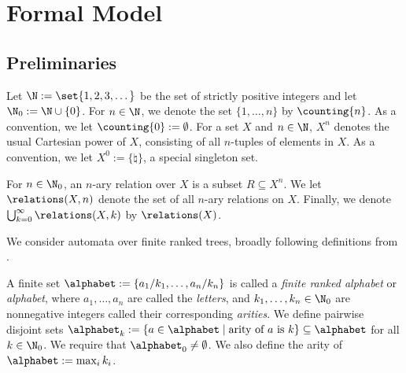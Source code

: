 \section{Formal Model}\label{sec:formalModel-trees}

\subsection{Preliminaries}\label{subsec:preliminaries}

Let $\N := \set{1, 2, 3, \dots}$ be the set of strictly positive integers and let $\N_0 := \N \cup \{0\}$. For $n \in \N$, we denote the set $\{1, \ldots, n\}$ by $\counting{n}$. As a convention, we let $\counting{0} := \emptyset$. For a set $X$ and $n \in \N$, $X^n$ denotes the usual Cartesian power of $X$, consisting of all $n$-tuples of elements in $X$. As a convention, we let $X^0 := \{\natural\}$, a special singleton set.


For $n \in \N_0$, an $n$-ary relation over $X$ is a subset $R \subseteq X^n$. We let $\relations(X, n)$ denote the set of all $n$-ary relations on $X$. Finally, we denote $\bigcup_{k=0}^\infty \relations(X, k)$ by $\relations(X)$.


We consider automata over finite ranked trees, broadly following definitions from \cite{tata}.

\begin{definition}[Alphabet]\label{def:alphabet}
    A finite set $\alphabet := \{a_1/k_1, \dots, a_n/k_n\}$ is called a \emph{finite ranked alphabet} or \emph{alphabet}, where $a_1, \dots, a_n$ are called the \emph{letters}, and $k_1, \dots, k_n \in \N_0$ are nonnegative integers called their corresponding \emph{arities}. We define pairwise disjoint sets $\alphabet_k := \{a \in \alphabet \mid \mbox{arity of $a$ is $k$}\} \subseteq \alphabet$ for all $k \in \N_0$. We require that $\alphabet_0 \neq \emptyset$. We also define the arity of $\alphabet := \max_{i} k_i$.
\end{definition}

